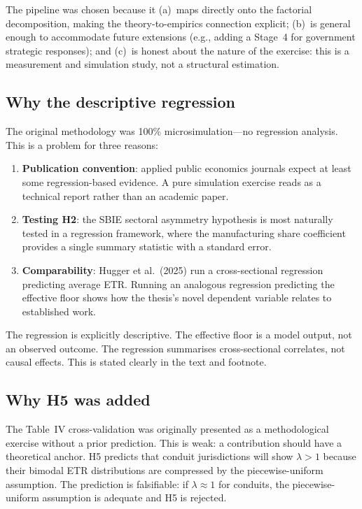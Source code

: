 \documentclass[11pt,a4paper]{article}
\begin{document}
The pipeline was chosen because it (a)~maps directly onto the factorial decomposition, making the theory-to-empirics connection explicit; (b)~is general enough to accommodate future extensions (e.g., adding a Stage~4 for government strategic responses); and (c)~is honest about the nature of the exercise: this is a measurement and simulation study, not a structural estimation.

\subsection{Why the descriptive regression}

The original methodology was 100\% microsimulation---no regression analysis. This is a problem for three reasons:

\begin{enumerate}[noitemsep]
\item \textbf{Publication convention}: applied public economics journals expect at least some regression-based evidence. A pure simulation exercise reads as a technical report rather than an academic paper.
\item \textbf{Testing H2}: the SBIE sectoral asymmetry hypothesis is most naturally tested in a regression framework, where the manufacturing share coefficient provides a single summary statistic with a standard error.
\item \textbf{Comparability}: Hugger et al.\ (2025) run a cross-sectional regression predicting average ETR. Running an analogous regression predicting the effective floor shows how the thesis's novel dependent variable relates to established work.
\end{enumerate}

The regression is explicitly descriptive. The effective floor is a model output, not an observed outcome. The regression summarises cross-sectional correlates, not causal effects. This is stated clearly in the text and footnote.

\subsection{Why H5 was added}

The Table~IV cross-validation was originally presented as a methodological exercise without a prior prediction. This is weak: a contribution should have a theoretical anchor. H5 predicts that conduit jurisdictions will show $\lambda > 1$ because their bimodal ETR distributions are compressed by the piecewise-uniform assumption. The prediction is falsifiable: if $\lambda \approx 1$ for conduits, the piecewise-uniform assumption is adequate and H5 is rejected.
\end{document}
